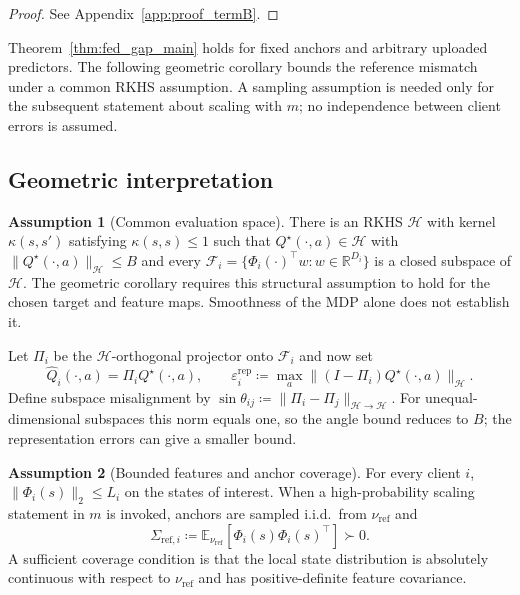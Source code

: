 \documentclass[sigconf,anonymous]{aamas}
\theoremstyle{plain}
\theoremstyle{definition}
\newtheorem{assumption}{Assumption}
\theoremstyle{remark}
\newcommand{\defeq}{\coloneqq}
\begin{document}
\begin{proof}
See Appendix~\ref{app:proof_termB}.
\end{proof}

Theorem~\ref{thm:fed_gap_main} holds for fixed anchors and arbitrary
uploaded predictors.  The following geometric corollary bounds the
reference mismatch under a common RKHS assumption.  A sampling
assumption is needed only for the subsequent statement about scaling
with $m$; no independence between client errors is assumed.

\subsection{Geometric interpretation}

\begin{assumption}[Common evaluation space]
\label{assum:common_rkhs}
There is an RKHS $\mathcal H$ with kernel
$\kappa(s,s')$ satisfying $\kappa(s,s)\le1$ such that
$Q^\star(\cdot,a)\in\mathcal H$ with
$\|Q^\star(\cdot,a)\|_{\mathcal H}\le B$ and every
$\mathcal F_i=\{\Phi_i(\cdot)^\top w:w\in\mathbb R^{D_i}\}$ is a closed
subspace of $\mathcal H$.  The geometric corollary requires this
structural assumption to hold for the chosen target and feature maps.
Smoothness of the MDP alone does not establish it.
\end{assumption}

Let $\Pi_i$ be the $\mathcal H$-orthogonal projector onto $\mathcal F_i$
and now set
\[
\hat Q_i(\cdot,a)=\Pi_iQ^\star(\cdot,a),\qquad
\varepsilon_i^{\mathrm{rep}}
\defeq
\max_a\|(I-\Pi_i)Q^\star(\cdot,a)\|_{\mathcal H}.
\]
Define subspace misalignment by
$\sin\theta_{ij}\defeq\|\Pi_i-\Pi_j\|_{\mathcal H\to\mathcal H}$.
For unequal-dimensional subspaces this norm equals one, so the
angle bound reduces to $B$; the representation errors can give a
smaller bound.

\begin{assumption}[Bounded features and anchor coverage]
\label{assum:anchor}
For every client $i$,
$\|\Phi_i(s)\|_2\le L_i$ on the states of interest.  When a
high-probability scaling statement in $m$ is invoked, anchors are sampled
i.i.d.\ from $\nu_{\mathrm{ref}}$ and
\[
\Sigma_{\mathrm{ref},i}
\defeq
\mathbb E_{\nu_{\mathrm{ref}}}
[\Phi_i(s)\Phi_i(s)^\top]\succ0.
\]
A sufficient coverage condition is that the local state distribution is
absolutely continuous with respect to $\nu_{\mathrm{ref}}$ and has
positive-definite feature covariance.
\end{assumption}
\end{document}
